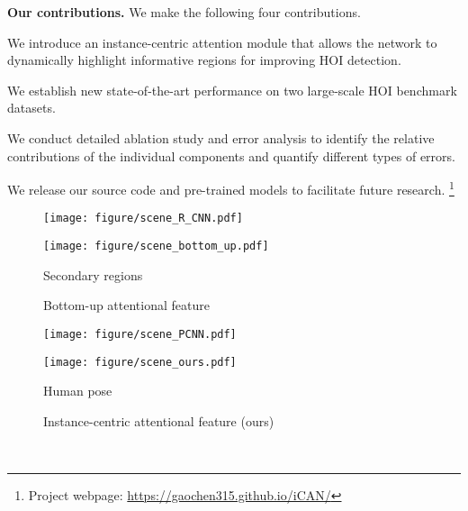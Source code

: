 \documentclass{bmvc2k}
\newlength\figmargin
\newlength\secmargin
\newlength\figbmargin
\newcommand{\mpage}[2]
{
\begin{minipage}{#1\linewidth}\centering
#2
\end{minipage}
}
\begin{document}
\textbf{Our contributions.} We make the following four contributions.
\begin{compactitem}
\item We introduce an instance-centric attention module that allows the network to dynamically highlight informative regions for improving HOI detection.
\item We establish new state-of-the-art performance on two large-scale HOI benchmark datasets.
\item We conduct detailed ablation study and error analysis to identify the relative contributions of the individual components and quantify different types of errors. 
\item We release our source code and pre-trained models to facilitate future research. 
\footnote{Project webpage: \url{https://gaochen315.github.io/iCAN/}}
\end{compactitem}



















 \begin{figure}[t]
\centering

\mpage{0.33}{\texttt{[image: figure/scene\_R\_CNN.pdf]}}
\mpage{0.65}{\texttt{[image: figure/scene\_bottom\_up.pdf]}}\hfill

\mpage{0.33}{Secondary regions~\cite{Gkioxari-ICCV-R*CNN}}\hfill
\mpage{0.6}{Bottom-up attentional feature~\cite{Girdhar-NIPS-AttentionalPooling}}\hfill





\mpage{0.33}{\texttt{[image: figure/scene\_PCNN.pdf]}}
\mpage{0.65}{\texttt{[image: figure/scene\_ours.pdf]}}\hfill

\mpage{0.35}{Human pose~\cite{Cheron-ICCV-PCNN}}\hfill
\mpage{0.55}{Instance-centric attentional feature (ours)}\hfill
\\
\vspace{\figmargin}
\vspace{\figbmargin}
\label{fig:scene}
\end{figure} 
\vspace{\secmargin}
\end{document}
